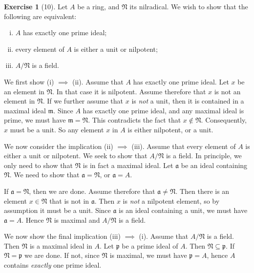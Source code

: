 \documentclass{article}
\theoremstyle{definition}
\newtheorem*{exercise}{Exercise}
\begin{document}
\begin{exercise}[10]
	Let $A$ be a ring, and $\mathfrak{N}$ its nilradical. We wish to show that the following are equivalent:
	\begin{enumerate}[(i)]
		\item $A$ has exactly one prime ideal;
		\item every element of $A$ is either a unit or nilpotent;
		\item $A / \mathfrak{N}$ is a field.
	\end{enumerate}
	We first show (i) $\implies$ (ii). Assume that $A$ has exactly one
	prime ideal. Let $x$ be an element in $\mathfrak{N}$. In that case it
	is nilpotent. Assume therefore that $x$ is not an element in
	$\mathfrak{N}$. If we further assume that $x$ is \emph{not} a unit,
	then it is contained in a maximal ideal $\mathfrak{m}$. Since $A$ has
	exactly one prime ideal, and any maximal ideal is prime, we must have
	$\mathfrak{m} = \mathfrak{N}$. This contradicts the fact that $x \notin
	\mathfrak{N}$. Consequently, $x$ must be a unit. So any element $x$ in
	$A$ is either nilpotent, or a unit.

	We now consider the implication (ii) $\implies$ (iii). Assume that
	every element of $A$ is either a unit or nilpotent. We seek to show
	that $A / \mathfrak{N}$ is a field. In principle, we only need to show
	that $\mathfrak{N}$ is in fact a maximal ideal. Let $\mathfrak{a}$ be
	an ideal containing $\mathfrak{N}$. We need to show that $\mathfrak{a}
	= \mathfrak{N}$, or $\mathfrak{a} = A$.

	If $\mathfrak{a} = \mathfrak{N}$, then we are done. Assume therefore
	that $\mathfrak{a} \neq \mathfrak{N}$. Then there is an element $x \in
	\mathfrak{N}$ that is not in $\mathfrak{a}$. Then $x$ is \emph{not} a
	nilpotent element, so by assumption it must be a unit. Since
	$\mathfrak{a}$ is an ideal containing a unit, we must have
	$\mathfrak{a} = A$. Hence $\mathfrak{N}$ is maximal and $A /
	\mathfrak{N}$ is a field.

	We now show the final implication (iii) $\implies$ (i). Assume that $A
	/ \mathfrak{N}$ is a field. Then $\mathfrak{N}$ is a maximal ideal in
	$A$. Let $\mathfrak{p}$ be a prime ideal of $A$. Then $\mathfrak{N}
	\subseteq \mathfrak{p}$. If $\mathfrak{N} = \mathfrak{p}$ we are done.
	If not, since $\mathfrak{N}$ is maximal, we must have $\mathfrak{p} =
	A$, hence $A$ contains \emph{exactly} one prime ideal.
\end{exercise}
\end{document}
